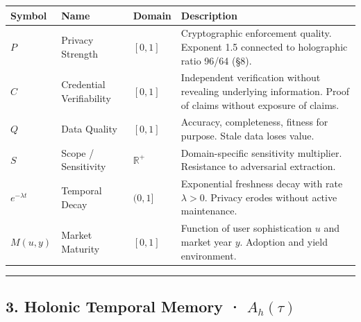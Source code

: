 \documentclass[
  11pt,
]{article}
\newcounter{none} %
\begin{document}
{\def\LTcaptype{none} %
\begin{longtable}[]{@{}
  >{\raggedright\arraybackslash}p{}
  >{\raggedright\arraybackslash}p{}
  >{\raggedright\arraybackslash}p{}
  >{\raggedright\arraybackslash}p{}@{}}
\toprule\noalign{}
\begin{minipage}[b]{\linewidth}\raggedright
Symbol
\end{minipage} & \begin{minipage}[b]{\linewidth}\raggedright
Name
\end{minipage} & \begin{minipage}[b]{\linewidth}\raggedright
Domain
\end{minipage} & \begin{minipage}[b]{\linewidth}\raggedright
Description
\end{minipage} \\
\midrule\noalign{}
\endhead
\bottomrule\noalign{}
\endlastfoot
\(P\) & Privacy Strength & \([0, 1]\) & Cryptographic enforcement
quality. Exponent 1.5 connected to holographic ratio 96/64 (§8). \\
\(C\) & Credential Verifiability & \([0, 1]\) & Independent verification
without revealing underlying information. Proof of claims without
exposure of claims. \\
\(Q\) & Data Quality & \([0, 1]\) & Accuracy, completeness, fitness for
purpose. Stale data loses value. \\
\(S\) & Scope / Sensitivity & \(\mathbb{R}^+\) & Domain-specific
sensitivity multiplier. Resistance to adversarial extraction. \\
\(e^{-\lambda t}\) & Temporal Decay & \((0, 1]\) & Exponential freshness
decay with rate \(\lambda > 0\). Privacy erodes without active
maintenance. \\
\(M(u, y)\) & Market Maturity & \([0, 1]\) & Function of user
sophistication \(u\) and market year \(y\). Adoption and yield
environment. \\
\end{longtable}
}

\begin{center}\rule{0.5\linewidth}{0.5pt}\end{center}

\subsection{\texorpdfstring{3. Holonic Temporal Memory ·
\(A_h(\tau)\)}{3. Holonic Temporal Memory · A\_h(\textbackslash tau)}}\label{holonic-temporal-memory-a_htau}
\end{document}
